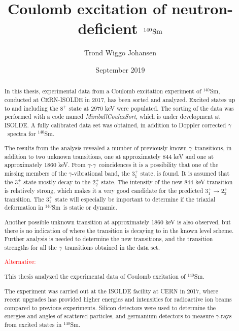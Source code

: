 \documentclass[twoside,english]{uiofysmaster/uiofysmaster}
\author{Trond Wiggo Johansen}
\title{Coulomb excitation of neutron-deficient $\textnormal{\Sm}$}
\date{September 2019}
\newcommand{\Sm}{$^{140}$Sm} %
\newcommand{\ga}{$\gamma$}
\begin{document}
\setlength{\belowdisplayskip}{12pt} \setlength{\belowdisplayshortskip}{12pt}
\setlength{\abovedisplayskip}{12pt} \setlength{\abovedisplayshortskip}{12pt}

\maketitle


\begin{abstract}

In this thesis, experimental data from a Coulomb excitation experiment of \Sm, conducted at CERN-ISOLDE in 2017, has been sorted and analyzed. 
Excited states up to and including the $8^+$ state at 2970 keV were populated.
The sorting of the data was performed with a code named \textsl{MiniballCoulexSort}, which is under development at ISOLDE. 
A fully calibrated data set was obtained, in addition to Doppler corrected \ga\ spectra for \Sm.

The results from the analysis revealed a number of previously known \ga\ transitions, in addition to two unknown transitions, one at approximately 844 keV and one at approximately 1860 keV. 
From \ga-\ga\ coincidences it is a possibility that one of the missing members of the \ga-vibrational band, the $3_1^+$ state, is found. 
It is assumed that the $3_1^+$ state mostly decay to the $2_2^+$ state.
The intensity of the new 844 keV transition is relatively strong, which makes it a very good candidate for the predicted $3_1^+ \rightarrow 2_2^+$ transition.
The $3_1^+$ state will especially be important to determine if the triaxial deformation in \Sm\ is static or dynamic.

Another possible unknown transition at approximately 1860 keV is also observed, but there is no indication of where the transition is decaying to in the known level scheme.
Further analysis is needed to determine the new transitions, and the transition strengths for all the \ga\ transitions obtained in the data set.


\bigskip


\textcolor{red}{Alternative:}

This thesis analyzed the experimental data of Coulomb excitation of \Sm.

The experiment was carried out at the ISOLDE facility at CERN in 2017, where recent upgrades
has provided higher energies and intensities for radioactive ion beams compared to previous experiments.
Silicon detectors were used to determine the energies and angles of scattered particles, and
germanium detectors to measure \ga-rays from excited states in \Sm.


\end{abstract}
\end{document}
